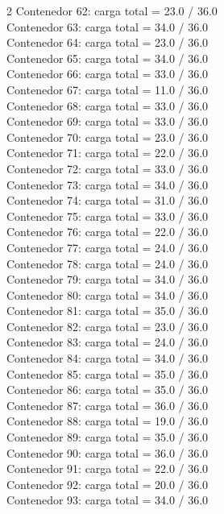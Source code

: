 \begin{multicols}{2}
Contenedor 62: carga total = 23.0 / 36.0\\
Contenedor 63: carga total = 34.0 / 36.0\\
Contenedor 64: carga total = 23.0 / 36.0\\
Contenedor 65: carga total = 34.0 / 36.0\\
Contenedor 66: carga total = 33.0 / 36.0\\
Contenedor 67: carga total = 11.0 / 36.0\\
Contenedor 68: carga total = 33.0 / 36.0\\
Contenedor 69: carga total = 33.0 / 36.0\\
Contenedor 70: carga total = 23.0 / 36.0\\
Contenedor 71: carga total = 22.0 / 36.0\\
Contenedor 72: carga total = 33.0 / 36.0\\
Contenedor 73: carga total = 34.0 / 36.0\\
Contenedor 74: carga total = 31.0 / 36.0\\
Contenedor 75: carga total = 33.0 / 36.0\\
Contenedor 76: carga total = 22.0 / 36.0\\
Contenedor 77: carga total = 24.0 / 36.0\\
Contenedor 78: carga total = 24.0 / 36.0\\
Contenedor 79: carga total = 34.0 / 36.0\\
Contenedor 80: carga total = 34.0 / 36.0\\
Contenedor 81: carga total = 35.0 / 36.0\\
Contenedor 82: carga total = 23.0 / 36.0\\
Contenedor 83: carga total = 24.0 / 36.0\\
Contenedor 84: carga total = 34.0 / 36.0\\
Contenedor 85: carga total = 35.0 / 36.0\\
Contenedor 86: carga total = 35.0 / 36.0\\
Contenedor 87: carga total = 36.0 / 36.0\\
Contenedor 88: carga total = 19.0 / 36.0\\
Contenedor 89: carga total = 35.0 / 36.0\\
Contenedor 90: carga total = 36.0 / 36.0\\
Contenedor 91: carga total = 22.0 / 36.0\\
Contenedor 92: carga total = 20.0 / 36.0\\
Contenedor 93: carga total = 34.0 / 36.0\\

\end{multicols}

